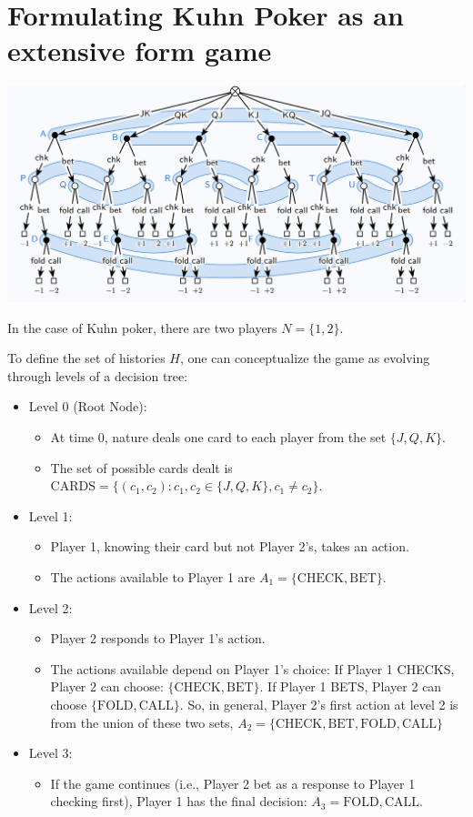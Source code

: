 \documentclass{article}
\begin{document}
\section{Formulating Kuhn Poker as an extensive form game}

\includegraphics[scale=.44]{game_tree}


In the case of Kuhn poker, there are two players $N = \{1,2 \}$. 


To define the set of histories $H$, one can conceptualize the game as evolving through levels of a decision tree:

\begin{itemize}
\item Level 0 (Root Node):
\begin{itemize}
\item At time 0, nature deals one card to each player from the set $\{J, Q, K \}$.
\item The set of possible cards dealt is $\text{CARDS}  = \{ (c_1, c_2) : c_1, c_2 \in \{J, Q, K \}, c_1 \neq c_2 \}$.
\end{itemize}
\item Level 1:
\begin{itemize}
\item Player 1, knowing their card but not Player 2's, takes an action.
\item The actions available to Player 1 are $A_1 = \{\text{CHECK}, \text{BET}\}$.
\end{itemize}
\item Level 2:
\begin{itemize}
\item Player 2 responds to Player 1's action. 
\item The actions available depend on Player 1's choice:
If Player 1 CHECKS, Player 2 can choose: $\{ \text{CHECK}, \text{BET} \}$. If Player 1 BETS, Player 2 can choose $\{ \text{FOLD}, \text{CALL} \}$. So, in general, Player 2's first action at level 2 is from the union of these two sets, $A_2 = \{\text{CHECK}, \text{BET}, \text{FOLD}, \text{CALL} \}$ 
\end{itemize}
\item  Level 3: 
\begin{itemize}
\item If the game continues (i.e., Player 2 bet as a response to Player 1 checking first), Player 1 has the final decision: $A_3 = \text{FOLD}, \text{CALL}$.
\end{itemize}
\end{itemize}
\end{document}
